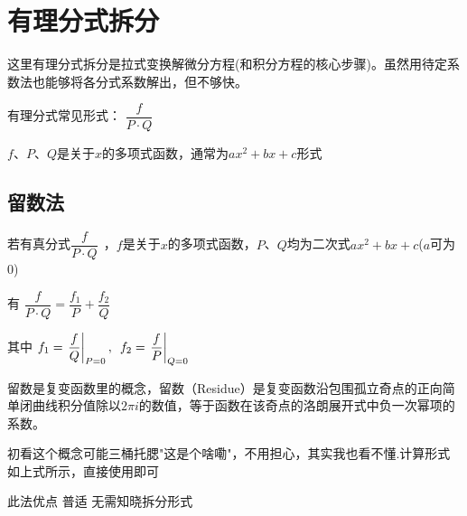 
\chapter{有理分式拆分}

这里有理分式拆分是拉式变换解微分方程(和积分方程的核心步骤)。虽然用待定系数法也能够将各分式系数解出，但不够快。

\begin{center}
	有理分式常见形式：\hspace{1em}  $\dfrac{f}{P\cdot Q}\:$ 
	
	\vspace{10pt}
	
	$f、P、Q$是关于$x$的多项式函数，通常为$ax^{2}+bx+c$形式
\end{center}

\section{留数法}

 \hspace{0.5em} 若有真分式$\dfrac{f}{P\cdot Q}\:\:$，$f$是关于$x$的多项式函数，$P$、$Q$均为二次式$ax^{2}+bx+c$\hspace{0.5em}($a$可为0)

\vspace{-8pt}

\begin{center}
	有 \hspace{2em} $\dfrac{f}{P\cdot Q}=\dfrac{f_{1}}{P}+\dfrac{f_{2}}{Q}\:$
	
	\vspace{10pt}
	
	其中 \hspace{2em} $f_{1}=\left. \dfrac{f}{Q} \right|_{P=0} , \hspace{0.5em} f_{2}=\left. \dfrac{f}{P} \right|_{Q=0}$
\end{center}

留数是复变函数里的概念，留数（Residue）是复变函数沿包围孤立奇点的正向简单闭曲线积分值除以$2\pi i$的数值，等于函数在该奇点的洛朗展开式中负一次幂项的系数。

初看这个概念可能三桶托腮"这是个啥嘞"，不用担心，其实我也看不懂.计算形式如上式所示，直接使用即可

此法优点\hspace{2em}  \textbullet \hspace{0.5em} 普适 \hspace{1em}  \textbullet \hspace{0.5em} 无需知晓拆分形式

